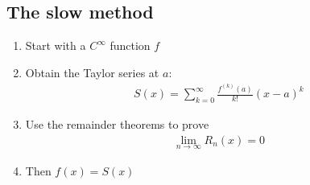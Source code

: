 \subsection*{The slow method}
\begin{enumerate}
    \item Start with a \(C^\infty\) function \(f\)
    \item Obtain the Taylor series at \(a\): \begin{align*}
              S(x) = \sum_{k = 0}^{\infty} \frac{f^{(k)}(a)}{k!} (x-a)^k
          \end{align*}
    \item Use the remainder theorems to prove \begin{align*}
              \lim_{n\to\infty} R_n(x) = 0
          \end{align*}
    \item Then \(f(x) = S(x)\)
\end{enumerate}
